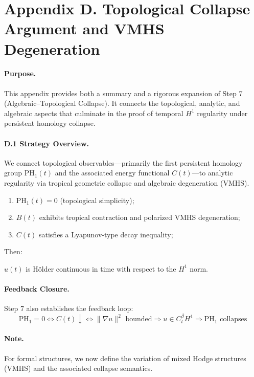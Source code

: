 \documentclass[11pt]{article}
\theoremstyle{definition}
\begin{document}

\section*{Appendix D. Topological Collapse Argument and VMHS Degeneration}

\paragraph{Purpose.}
This appendix provides both a summary and a rigorous expansion of Step 7 (Algebraic–Topological Collapse). It connects the topological, analytic, and algebraic aspects that culminate in the proof of temporal $H^1$ regularity under persistent homology collapse.

\paragraph{D.1 Strategy Overview.}
We connect topological observables—primarily the first persistent homology group $\mathrm{PH}_1(t)$ and the associated energy functional $C(t)$—to analytic regularity via tropical geometric collapse and algebraic degeneration (VMHS).

\begin{enumerate}
  \item $\mathrm{PH}_1(t) = 0$ (topological simplicity);
  \item $B(t)$ exhibits tropical contraction and polarized VMHS degeneration;
  \item $C(t)$ satisfies a Lyapunov-type decay inequality;
\end{enumerate}

Then:
\begin{center}
$u(t)$ is Hölder continuous in time with respect to the $H^1$ norm.
\end{center}

\paragraph{Feedback Closure.}
Step 7 also establishes the feedback loop:
\[
\mathrm{PH}_1 = 0 \Leftrightarrow C(t) \downarrow \Leftrightarrow \|\nabla u\|^2 \text{ bounded} \Rightarrow u \in C^{\beta}_t H^1 \Rightarrow \mathrm{PH}_1 \text{ collapses}
\]

\paragraph{Note.} For formal structures, we now define the variation of mixed Hodge structures (VMHS) and the associated collapse semantics.
\end{document}
